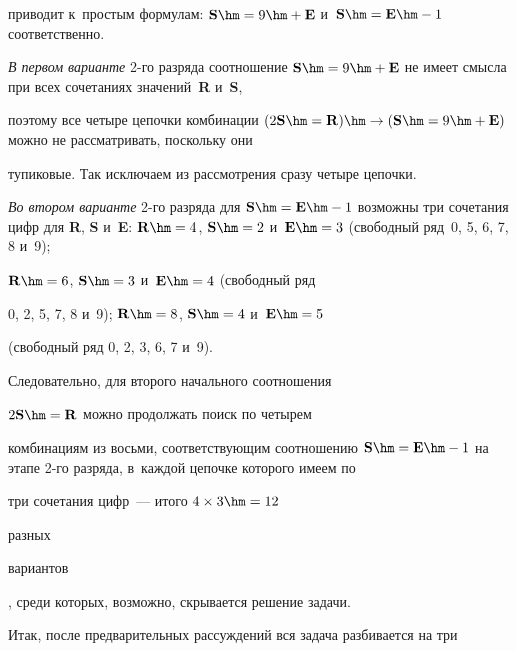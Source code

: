 приводит к~простым формулам: $\mathbf{S} \hm= 9 \hm+ \mathbf{E}$ и~$\mathbf{S}\hm 


= \mathbf{E}\hm- 1$ соответственно. 


    


    \textit{В первом варианте} 2-го разряда соотношение $\mathbf{S}\hm = 9 


\hm+ \mathbf{E}$ не имеет смысла при всех сочетаниях значений~\textbf{R} и~\textbf{S}, 


поэтому все четыре цепочки комбинации $(2\mathbf{S}\hm = \mathbf{R})\hm\to 


(\mathbf{S}\hm = 9 \hm+ \mathbf{E})$ можно не рассматривать, поскольку они 


тупиковые. Так исключаем из рассмотрения сразу четыре цепочки. 


    


    \textit{Во втором варианте} 2-го разряда для $\mathbf{S}\hm = 


\mathbf{E}\hm- 1$ возможны три сочетания цифр для \textbf{R}, \textbf{S} и~\textbf{E}: $\mathbf{R}\hm 


= 4$, $\mathbf{S}\hm = 2$ и~$\mathbf{E}\hm = 3$ (свободный ряд~0, 5, 6, 7, 8 и~9); 


$\mathbf{R}\hm = 6$, $\mathbf{S}\hm = 3$ и~$\mathbf{E}\hm = 4$ (свободный ряд 


0, 2, 5, 7, 8 и~9); $\mathbf{R}\hm = 8$, $\mathbf{S}\hm = 4$ и~$\mathbf{E}\hm = 5$ 


(свободный ряд 0, 2, 3, 6, 7 и~9). 


    


    Следовательно, {для второго начального соотношения} 


$2\mathbf{S}\hm= \mathbf{R}$ можно продолжать поиск по четырем 


комбинациям из восьми, соответствующим соотношению $\mathbf{S}\hm = 


\mathbf{E}\hm- 1$ на этапе 2-го разряда, в~каждой цепочке которого имеем по 


три сочетания цифр~--- итого $4\times 3 \hm= {12}$~{разных 


вариантов}, среди которых, возможно, скрывается решение задачи. 


    


    Итак, после предварительных рассуждений вся задача разбивается на три 


